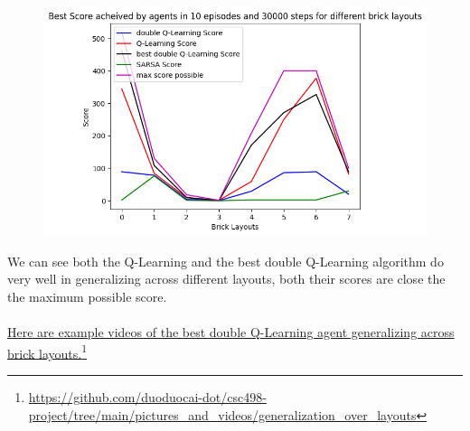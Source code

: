 \documentclass[twoside,11pt]{article}
\newcommand\fnurl[2]{%
  \href{#2}{#1}\footnote{\url{#2}}%
}
\begin{document}
\begin{figure}[H]
\includegraphics[scale=0.6]{BrickLayouts_generalization_tests}
\centering
\end{figure}
We can see both the Q-Learning and the best double Q-Learning algorithm do very well in generalizing across different layouts, both their scores are close the the maximum possible score.
\\\\
\fnurl{Here are example videos of the best double Q-Learning agent generalizing across brick layouts.}{https://github.com/duoduocai-dot/csc498-project/tree/main/pictures_and_videos/generalization_over_layouts}
\end{document}
